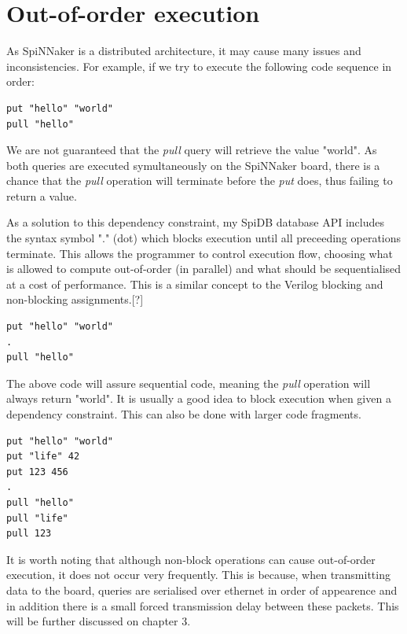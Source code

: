 \section{Out-of-order execution}
As SpiNNaker is a distributed architecture, it may cause many issues and inconsistencies.
For example, if we try to execute the following code sequence in order:\\
\begin{lstlisting}[caption={Non-blocking execution}, label=list:non-blocking]
put "hello" "world"
pull "hello"
\end{lstlisting}

We are not guaranteed that the \textit{pull} query will retrieve the value "world". As both queries are executed symultaneously on the SpiNNaker board, there is a chance that the \textit{pull} operation will terminate before the \textit{put} does, thus failing to return a value.

As a solution to this dependency constraint, my SpiDB database API includes the syntax symbol "." (dot) which blocks execution until all preceeding operations terminate. This allows the programmer to control execution flow, choosing what is allowed to compute out-of-order (in parallel) and what should be sequentialised at a cost of performance. This is a similar concept to the Verilog blocking and non-blocking assignments.[?]

\begin{lstlisting}[caption={Blocking execution}, label=list:blocking1]
put "hello" "world"
.
pull "hello"
\end{lstlisting}

The above code will assure sequential code, meaning the \textit{pull} operation will always return "world". It is usually a good idea to block execution when given a dependency constraint. This can also be done with larger code fragments.

\begin{lstlisting}[caption={Blocking execution}, label=list:blocking2]
put "hello" "world"
put "life" 42
put 123 456
.
pull "hello"
pull "life"
pull 123
\end{lstlisting}

It is worth noting that although non-block operations can cause out-of-order execution, it does not occur very frequently. This is because, when transmitting data to the board, queries are serialised over ethernet in order of appearence and in addition there is a small forced transmission delay between these packets. This will be further discussed on chapter 3.%

